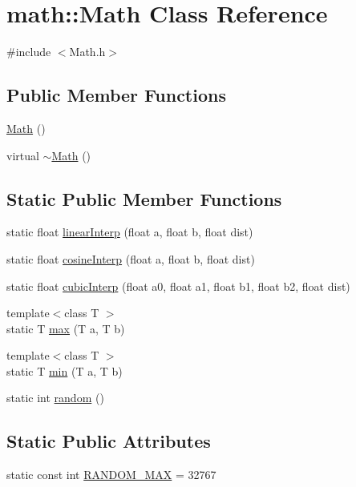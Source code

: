 \hypertarget{classmath_1_1Math}{
\section{math::Math Class Reference}
\label{classmath_1_1Math}
}


{\ttfamily \#include $<$Math.h$>$}

\subsection*{Public Member Functions}
\begin{DoxyCompactItemize}
\item 
\hyperlink{classmath_1_1Math_a0baef779a970805b859ab68e97f13a9d}{Math} ()
\item 
virtual \hyperlink{classmath_1_1Math_a841546dc56f4aa88b380da2ba0211070}{$\sim$Math} ()
\end{DoxyCompactItemize}
\subsection*{Static Public Member Functions}
\begin{DoxyCompactItemize}
\item 
static float \hyperlink{classmath_1_1Math_a6d27f733861106075404b2e1fa2a0cd2}{linearInterp} (float a, float b, float dist)
\item 
static float \hyperlink{classmath_1_1Math_aea2ccc706b593ea4f1e8e34b79a3d59c}{cosineInterp} (float a, float b, float dist)
\item 
static float \hyperlink{classmath_1_1Math_a48ef0e0dbbcb7a863d2a55c033bdfb38}{cubicInterp} (float a0, float a1, float b1, float b2, float dist)
\item 
{\footnotesize template$<$class T $>$ }\\static T \hyperlink{classmath_1_1Math_a0a15a0900bf268a1fa4512a11f0485ba}{max} (T a, T b)
\item 
{\footnotesize template$<$class T $>$ }\\static T \hyperlink{classmath_1_1Math_ae45721aabf3738cb54c91499063d2854}{min} (T a, T b)
\item 
static int \hyperlink{classmath_1_1Math_ad8e0aaa8846dda2c7df09c999549b1f2}{random} ()
\end{DoxyCompactItemize}
\subsection*{Static Public Attributes}
\begin{DoxyCompactItemize}
\item 
static const int \hyperlink{classmath_1_1Math_a8b8007f82a1fd063ea5ce5dfacbc531e}{RANDOM\_\-MAX} = 32767
\end{DoxyCompactItemize}


